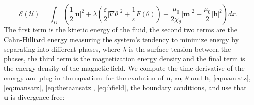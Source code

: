 \documentclass[10pt,letterpaper,twoside]{amsart}
\theoremstyle{definition}{\newtheorem{definition}[lemma]{Definition}}
\theoremstyle{note}{\newtheorem{claim}{Claim}[section]
\newtheorem*{claim*}{Claim}}
\numberwithin{equation}{section}
\newcommand{\dom}{D}
\newcommand{\sol}{\mathcal{U}}
\newcommand{\Grad}{\nabla}
\newcommand{\bu}{\mathbf{u}}
\newcommand{\bm}{\mathbf{m}}
\newcommand{\bh}{\mathbf{h}}
\begin{document}
\begin{equation}
	\label{eq:freeenergy}
	\mathcal{E}(\sol) = \int_{\dom} \left(\frac12|\bu|^2 + \lambda\left(\frac{\varepsilon}{2}|\Grad\theta|^2 +\frac{1}{\varepsilon}F(\theta)\right)+\frac{\mu_0}{2\chi_\theta}|\bm|^2 +\frac{\mu_0}{2}|\bh|^2\right) dx.
\end{equation}
The first term is the kinetic energy of the fluid, the second two terms are the Cahn-Hilliard energy measuring the system's tendency to minimize energy by separating into different phases, where $\lambda$ is the surface tension between the phases, the third term is the magnetization energy density and the final term is the energy density of the magnetic field. We compute the time derivative of the energy and plug in the equations for the evolution of $\bu$, $\bm$, $\theta$ and $\bh$, \eqref{eq:uansatz}, \eqref{eq:mansatz}, \eqref{eq:thetaansatz}, \eqref{eq:hfield}, the boundary conditions, and use that $\bu$ is divergence free:
\end{document}

